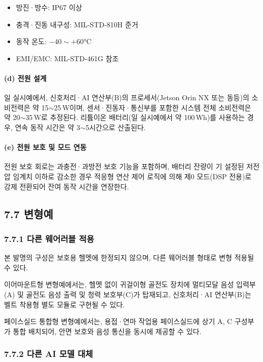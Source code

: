 \documentclass{article}
\begin{document}
\begin{itemize}
    \item 방진·방수: IP67 이상
    \item 충격·진동 내구성: MIL-STD-810H 준거
    \item 동작 온도: $-40 \sim +60$°C
    \item EMI/EMC: MIL-STD-461G 참조
\end{itemize}

\paragraph{(d) 전원 설계}

일 실시예에서, 신호처리·AI 연산부(B)의 프로세서(Jetson Orin NX 또는 동등)의 소비전력은 약 15$\sim$25\,W이며, 센서·진동자·통신부를 포함한 시스템 전체 소비전력은 약 20$\sim$35\,W로 추정된다. 리튬이온 배터리(일 실시예에서 약 100\,Wh)를 사용하는 경우, 연속 동작 시간은 약 3$\sim$5시간으로 산출된다.

\paragraph{(e) 전원 보호 및 모드 연동}

전원 보호 회로는 과충전·과방전 보호 기능을 포함하며, 배터리 잔량이 기 설정된 저전압 임계치 이하로 감소한 경우 적응형 연산 제어 로직에 의해 제0 모드(DSP 전용)로 강제 전환되어 잔여 동작 시간을 연장한다.

\subsection{7.7 변형예}

\subsubsection{7.7.1 다른 웨어러블 적용}

본 발명의 구성은 보호용 헬멧에 한정되지 않으며, 다른 웨어러블 형태로 변형 적용될 수 있다.

이어마운트형 변형예에서는, 헬멧 없이 귀걸이형 골전도 장치에 멀티모달 음성 입력부(A) 및 골전도 음성 출력 및 청력 보호부(C)가 탑재되고, 신호처리·AI 연산부(B)는 벨트 착용형 별도 모듈로 구현될 수 있다.

페이스실드 통합형 변형예에서는, 용접·연마 작업용 페이스실드에 상기 A, C 구성부가 통합 배치되어, 안면 보호와 음성 통신을 동시에 제공할 수 있다.

\subsubsection{7.7.2 다른 AI 모델 대체}
\end{document}
